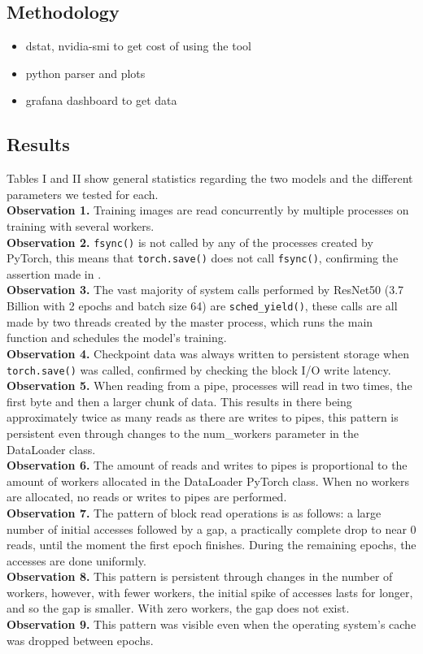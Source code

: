 \documentclass[conference]{IEEEtran}
\begin{document}
\subsection{Methodology}

\begin{itemize}
	\item dstat, nvidia-smi to get cost of using the tool
	\item python parser and plots
	\item grafana dashboard to get data
\end{itemize}

\subsection{Results}

Tables I and II show general statistics regarding the two models and the different parameters we tested for each.
\\
\textbf{Observation 1.} Training images are read concurrently by multiple processes on training with several workers.
\\
\textbf{Observation 2.} \texttt{fsync()} is not called by any of the processes created by PyTorch, this means that \texttt{torch.save()} does not call \texttt{fsync()}, confirming the assertion made in \cite{checkfreq}.
\\
\textbf{Observation 3.} The vast majority of system calls performed by ResNet50 (3.7 Billion with 2 epochs and batch size 64) are \texttt{sched\_yield()}, these calls are all made by two threads created by the master process, which runs the main function and schedules the model's training.
\\
\textbf{Observation 4.} Checkpoint data was always written to persistent storage when \texttt{torch.save()} was called, confirmed by checking the block I/O write latency.
\\
\textbf{Observation 5.} When reading from a pipe, processes will read in two times, the first byte and then a larger chunk of data. This results in there being approximately twice as many reads as there are writes to pipes, this pattern is persistent even through changes to the num\_workers parameter in the DataLoader class.
\\
\textbf{Observation 6.} The amount of reads and writes to pipes is proportional to the amount of workers allocated in the DataLoader PyTorch class. When no workers are allocated, no reads or writes to pipes are performed.
\\
\textbf{Observation 7.} The pattern of block read operations is as follows: a large number of initial accesses followed by a gap, a practically complete drop to near 0 reads,  until the moment the first epoch finishes. During the remaining epochs, the accesses are done uniformly. 
\\
\textbf{Observation 8.} This pattern is persistent through changes in the number of workers, however, with fewer workers, the initial spike of accesses lasts for longer, and so the gap is smaller. With zero workers, the gap does not exist. 
\\
\textbf{Observation 9.} This pattern was visible even when the operating system's cache was dropped between epochs.
\end{document}
